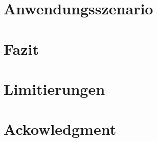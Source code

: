 \FloatBarrier
\section{Anwendungsszenario}
\section{Fazit}
\section{Limitierungen}
\section{Ackowledgment}
